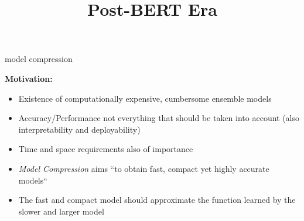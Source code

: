 



\newcommand{\titlefigure}{figure/53-distillation.png}
\newcommand{\learninggoals}{
\item soft vs. hard targets
\item understand how distillation works
\item DistilBERT
\item other approaches towards compression}

\title{Post-BERT Era}
\date{}




\begin{frame}{model compression}

\vfill

\textbf{Motivation:} 

\begin{itemize}
				\item Existence of computationally expensive, cumbersome ensemble models
				\item Accuracy/Performance not everything that should be taken into account (also interpretability and deployability)
				\item Time and space requirements also of importance
				\item \textit{Model Compression} aims ``to obtain fast, compact yet highly accurate models``
				\item The fast and compact model should approximate the function learned by the slower and larger model
\end{itemize}

\vfill

\end{frame}


